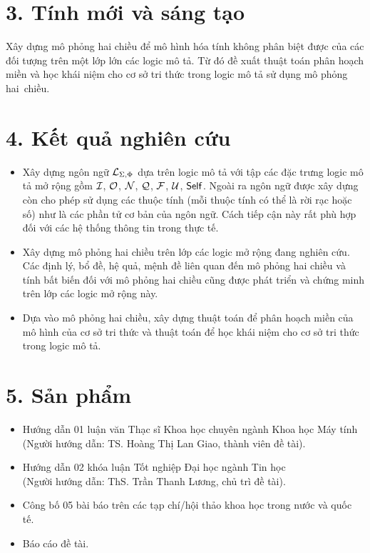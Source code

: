 \section*{3. Tính mới và sáng tạo}
Xây dựng mô phỏng hai chiều để mô hình hóa tính không phân biệt được của các đối tượng trên một lớp lớn các logic mô tả. Từ đó đề xuất thuật toán phân hoạch miền và học khái niệm cho cơ sở tri thức trong logic mô tả sử dụng mô phỏng hai~chiều.

\section*{4. Kết quả nghiên cứu}
\begin{itemize}
	\item Xây dựng ngôn ngữ $\mathcal{L}_{\Sigma,\Phi}$ dựa trên logic mô tả \ALCreg với tập các đặc trưng logic mô tả mở rộng gồm $\mathcal{I}$, $\mathcal{O}$, $\mathcal{N}$, $\mathcal{Q}$, $\mathcal{F}$, $\mathcal{U}$, $\mathsf{Self}$. Ngoài ra ngôn ngữ được xây dựng còn cho phép sử dụng các thuộc tính (mỗi thuộc tính có thể là rời rạc hoặc số) như là các phần tử cơ bản của ngôn ngữ. Cách tiếp cận này rất phù hợp đối với các hệ thống thông tin trong thực tế.
	
	\item Xây dựng mô phỏng hai chiều trên lớp các logic mở rộng đang nghiên cứu. Các định lý, bổ đề, hệ quả, mệnh đề liên quan đến mô phỏng hai chiều và tính bất biến đối với mô phỏng hai chiều cũng được phát triển và chứng minh trên lớp các logic mở rộng này.
	
	\item Dựa vào mô phỏng hai chiều, xây dựng thuật toán để phân hoạch miền của mô hình của cơ sở tri thức và thuật toán \BBCLearnS để học khái niệm cho cơ sở tri thức trong logic mô tả.
\end{itemize}
\section*{5. Sản phẩm}
\begin{itemize}
	\item Hướng dẫn 01 luận văn Thạc sĩ Khoa học chuyên ngành Khoa học Máy tính\\
	(Người hướng dẫn: TS. Hoàng Thị Lan Giao, thành viên đề tài).
	\item Hướng dẫn 02 khóa luận Tốt nghiệp Đại học ngành Tin học\\
	(Người hướng dẫn: ThS. Trần Thanh Lương, chủ trì đề tài).
	\item Công bố 05 bài báo trên các tạp chí/hội thảo khoa học trong nước và quốc tế.
	\item Báo cáo đề tài.
\end{itemize}
